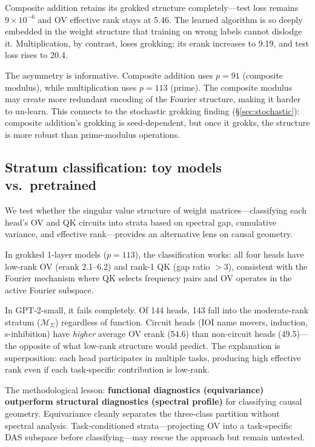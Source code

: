 \documentclass{article}
\begin{document}
Composite addition retains its grokked structure completely---test loss
remains $9 \times 10^{-6}$ and OV effective rank stays at 5.46. The learned
algorithm is so deeply embedded in the weight structure that training on
wrong labels cannot dislodge it. Multiplication, by contrast, loses
grokking: its erank increases to 9.19, and test
loss rises to 20.4.

The asymmetry is informative. Composite addition uses $p = 91$ (composite
modulus), while multiplication uses $p = 113$ (prime). The composite
modulus may create more redundant encoding of the Fourier structure,
making it harder to un-learn. This connects to the stochastic grokking
finding (\S\ref{sec:stochastic}): composite addition's grokking is
seed-dependent, but once it grokks, the structure is more robust than
prime-modulus operations.

\subsection{Stratum classification: toy models vs.\ pretrained}
\label{sec:strata}

We test whether the singular value structure of weight matrices---classifying
each head's OV and QK circuits into strata based on spectral gap, cumulative
variance, and effective rank---provides an alternative lens on causal
geometry.

In grokked 1-layer models ($p = 113$), the classification works: all four
heads have low-rank OV (erank 2.1--6.2) and rank-1 QK (gap ratio $> 3$),
consistent with the Fourier mechanism where QK selects frequency pairs and
OV operates in the active Fourier subspace.

In GPT-2-small, it fails completely. Of 144 heads, 143 fall into the
moderate-rank stratum ($\mathcal{M}_\Sigma$) regardless of function.
Circuit heads (IOI name movers, induction, s-inhibition) have \emph{higher}
average OV erank (54.6) than non-circuit heads (49.5)---the opposite of
what low-rank structure would predict. The explanation is superposition:
each head participates in multiple tasks, producing high effective rank
even if each task-specific contribution is low-rank.

The methodological lesson: \textbf{functional diagnostics (equivariance)
outperform structural diagnostics (spectral profile)} for classifying
causal geometry. Equivariance cleanly separates the three-class partition
without spectral analysis. Task-conditioned strata---projecting OV into
a task-specific DAS subspace before classifying---may rescue the approach
but remain untested.
\end{document}
